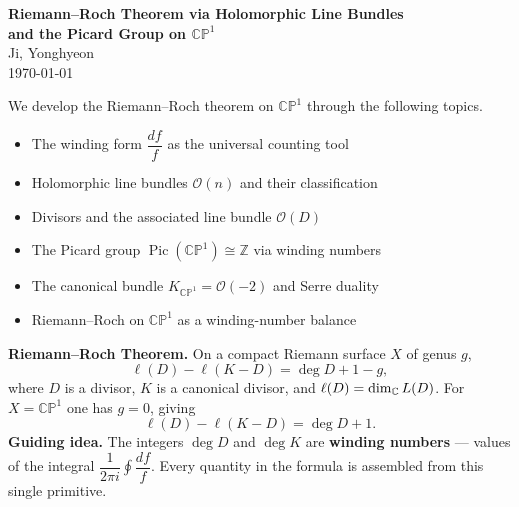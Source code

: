 \documentclass[11pt,openany]{article}
\renewcommand{\emph}[1]{\textbf{#1}}
\newenvironment{infobox}{%
  \def\FrameCommand{\fboxrule=0.8pt \fboxsep=8pt \colorbox{noteblue}}%
  \MakeFramed{\advance\hsize-\width \FrameRestore}}{\endMakeFramed}
\newcommand{\CP}{\mathbb{CP}}
\newcommand{\CPone}{\CP^1}
\newcommand{\OO}{\mathcal{O}}
\newcommand{\Pic}{\operatorname{Pic}}
\begin{document}

\begin{center}
  \Huge\textbf{Riemann--Roch Theorem via Holomorphic Line Bundles}\\[6pt]
  \Huge\textbf{and the Picard Group on $\CPone$}\\
  \vspace{0.6em}
  \large Ji, Yonghyeon\\
  \vspace{0.4em}
  \normalsize \today
\end{center}

\noindent
We develop the Riemann--Roch theorem on $\CPone$ through the following topics.
\begin{itemize}
  \item The winding form $\dfrac{df}{f}$ as the universal counting tool
  \item Holomorphic line bundles $\OO(n)$ and their classification
  \item Divisors and the associated line bundle $\OO(D)$
  \item The Picard group $\Pic(\CPone)\cong\mathbb{Z}$ via winding numbers
  \item The canonical bundle $K_{\CPone}=\OO(-2)$ and Serre duality
  \item Riemann--Roch on $\CPone$ as a winding-number balance
\end{itemize}

\medskip

\begin{infobox}
\textbf{Riemann--Roch Theorem.}
On a compact Riemann surface $X$ of genus $g$,
\[
  \ell(D) - \ell(K-D) = \deg D + 1 - g,
\]
where $D$ is a divisor, $K$ is a canonical divisor, and $\ell(D)=\dim_{\mathbb{C}} L(D)$.
For $X=\CPone$ one has $g=0$, giving
\[
  \ell(D) - \ell(K-D) = \deg D + 1.
\]
\textbf{Guiding idea.}
The integers $\deg D$ and $\deg K$ are \emph{winding numbers} — values of the integral
$\dfrac{1}{2\pi i}\oint\dfrac{df}{f}$.
Every quantity in the formula is assembled from this single primitive.
\end{infobox}

\newpage
\tableofcontents
\end{document}
